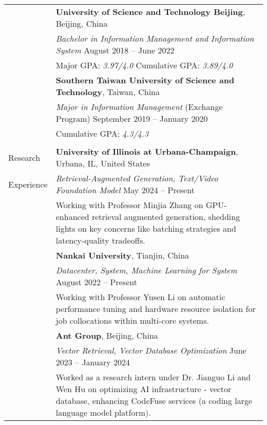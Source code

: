 \documentclass[letterpaper, 10pt]{article}
\begin{document}
\begin{longtable}{p{}p{}}
& \textbf{University of Science and Technology Beijing}, Beijing, China \\ 
& \textit{Bachelor in Information Management and Information System} \hfill August 2018 -- June 2022 \\
& Major GPA: \textit{3.97/4.0} \hspace{0.04\textwidth} Cumulative GPA: \textit{3.89/4.0}
\vspace{0.01\textwidth} \\

& \textbf{Southern Taiwan University of Science and Technology}, Taiwan, China \\ 
& \textit{Major in Information Management} (Exchange Program) \hfill September 2019 -- January 2020 \\
& Cumulative GPA: \textit{4.3/4.3} \\
& \\

\textcolor{OliveGreen}{Research}
& \textbf{University of Illinois at Urbana-Champaign}, Urbana, IL, United States \\ 
\textcolor{OliveGreen}{Experience} & \textit{Retrieval-Augmented Generation, Text/Video Foundation Model} \hfill May 2024 -- Present \\
&  Working with Professor Minjia Zhang on GPU-enhanced retrieval augmented generation, shedding lights on key concerns like batching strategies and
latency-quality tradeoffs.
\vspace{0.01\textwidth} \\


& \textbf{Nankai University}, Tianjin, China \\ 
& \textit{Datacenter, System, Machine Learning for System} \hfill August 2022 -- Present \\
&  Working with Professor Yusen Li on automatic performance tuning and hardware resource isolation for job collocations within multi-core systems.
\vspace{0.01\textwidth} \\


& \textbf{Ant Group}, Beijing, China \\ 
& \textit{Vector Retrieval, Vector Database Optimization} \hfill June 2023 -- January 2024 \\
&  Worked as a research intern under Dr. Jianguo Li and Wen Hu on optimizing AI infrastructure - vector database, enhancing CodeFuse services (a coding large language model platform).
\vspace{0.01\textwidth} \\



\end{longtable}
\end{document}
